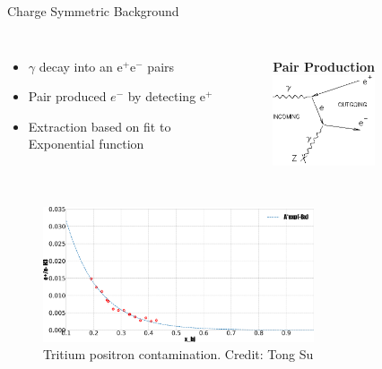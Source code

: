 \documentclass[12pt,usenames,dvipsnames]{beamer}
\begin{document}
\begin{frame}{Charge Symmetric Background}
\vspace{-0pt}

\begin{columns}
	\vspace*{-0.75cm}
	\begin{itemize}
		\item $\gamma$ decay into an e$^+$e$^-$ pairs
		\item  Pair produced $e^-$ by detecting e$^+$
		\item Extraction based on fit to Exponential function 
	\end{itemize}
	\vspace{-40pt}
	\begin{figure}
		\textbf{Pair Production}
		\includegraphics[width=3.0cm]{../images/pp_FD.png}
	\end{figure}
\end{columns}


\begin{figure}
	\caption*{Tritium positron contamination. Credit: Tong Su}
	\includegraphics[width=8.0cm]{../images/positron_H3_bane.pdf}
\end{figure}




\end{frame}
\end{document}
